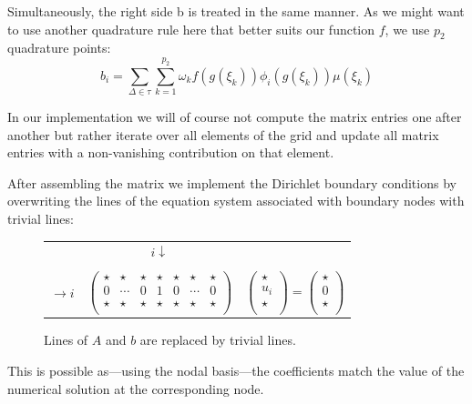 \documentclass[11pt,a4paper,headinclude,footinclude,DIV16,normalheadings]{scrreprt}
\begin{document}
Simultaneously, the right side b is treated in the same manner. As we might want to use another quadrature rule here that better suits our function $f$, we use $p_2$ quadrature points:
\begin{equation}
\label{equ:computeb}
 b_i = \sum\limits_{\Delta\in\tau}\sum\limits_{k=1}^{p_2}\omega_k f(g(\xi_k ))\phi_i (g(\xi_k ))\mu(\xi_k )
\end{equation}

In our implementation we will of course not compute the matrix entries one after another but rather iterate over all elements of the grid and update all matrix entries with a non-vanishing contribution on that element.

After assembling the matrix we implement the Dirichlet boundary conditions by overwriting the lines of the equation system associated with boundary nodes with trivial lines:

\begin{figure}[h]
\centering
\begin{tabular}{ccl}
& $\begin{array}{cccccccc}
& & &i\downarrow& & &\\
\end{array}$ & \\
$\rightarrow{i}$ &
$\left(\begin{array}{ccccccc}
\star&\star&\star&\star&\star&\star&\star\\
0&\cdots&0&1&0&\cdots&0\\
\star&\star&\star&\star&\star&\star&\star\\
\end{array}\right)$ &
$\left(\begin{array}{c}
\star \\
u_i \\
\star \\
\end{array}\right)
=
\left(\begin{array}{c}
\star \\
0 \\
\star \\
\end{array}\right)$
\end{tabular}
\caption{Lines of $A$ and $b$ are replaced by trivial lines.}
\label{Fig:dirichlet}
\end{figure}

This is possible as---using the nodal basis---the coefficients match the value of the numerical solution at the corresponding node.
\end{document}
